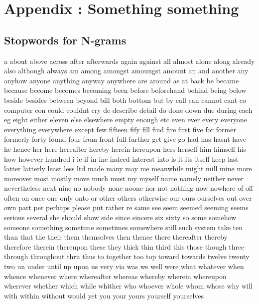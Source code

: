 
\renewcommand{\theequation}{B\arabic{equation}}
\setcounter{equation}{0}
\renewcommand{\thefigure}{B\arabic{figure}}
\setcounter{figure}{0}
\renewcommand{\thetable}{B\arabic{table}}
\setcounter{table}{0}


\clearpage

\thesisappendix

\section{Appendix \label{A}: Something something}

\subsection{Stopwords for N-grams}
\label{sub:Stopwords for N-grams}

a
about
above
across
after
afterwards
again
against
all
almost
alone
along
already
also
although
always
am
among
amongst
amoungst
amount
an
and
another
any
anyhow
anyone
anything
anyway
anywhere
are
around
as
at
back
be
became
because
become
becomes
becoming
been
before
beforehand
behind
being
below
beside
besides
between
beyond
bill
both
bottom
but
by
call
can
cannot
cant
co
computer
con
could
couldnt
cry
de
describe
detail
do
done
down
due
during
each
eg
eight
either
eleven
else
elsewhere
empty
enough
etc
even
ever
every
everyone
everything
everywhere
except
few
fifteen
fify
fill
find
fire
first
five
for
former
formerly
forty
found
four
from
front
full
further
get
give
go
had
has
hasnt
have
he
hence
her
here
hereafter
hereby
herein
hereupon
hers
herself
him
himself
his
how
however
hundred
i
ie
if
in
inc
indeed
interest
into
is
it
its
itself
keep
last
latter
latterly
least
less
ltd
made
many
may
me
meanwhile
might
mill
mine
more
moreover
most
mostly
move
much
must
my
myself
name
namely
neither
never
nevertheless
next
nine
no
nobody
none
noone
nor
not
nothing
now
nowhere
of
off
often
on
once
one
only
onto
or
other
others
otherwise
our
ours
ourselves
out
over
own
part
per
perhaps
please
put
rather
re
same
see
seem
seemed
seeming
seems
serious
several
she
should
show
side
since
sincere
six
sixty
so
some
somehow
someone
something
sometime
sometimes
somewhere
still
such
system
take
ten
than
that
the
their
them
themselves
then
thence
there
thereafter
thereby
therefore
therein
thereupon
these
they
thick
thin
third
this
those
though
three
through
throughout
thru
thus
to
together
too
top
toward
towards
twelve
twenty
two
un
under
until
up
upon
us
very
via
was
we
well
were
what
whatever
when
whence
whenever
where
whereafter
whereas
whereby
wherein
whereupon
wherever
whether
which
while
whither
who
whoever
whole
whom
whose
why
will
with
within
without
would
yet
you
your
yours
yourself
yourselves

